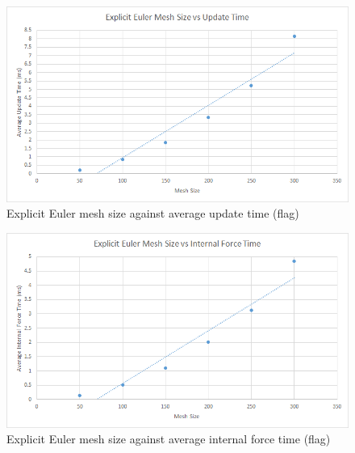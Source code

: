     \begin{figure}
    \begin{center}
      \includegraphics[scale=.9]{Figures/flag_ee_m_ut}
    \end{center}
    \caption{Explicit Euler mesh size against average update time (flag)}
    \label{fig:ee mesh update flag}
  \end{figure}
  
    \begin{figure}
    \begin{center}
      \includegraphics[scale=.9]{Figures/flag_ee_m_csf}
    \end{center}
    \caption{Explicit Euler mesh size against average internal force time (flag)}
    \label{fig:ee mesh csf flag}
  \end{figure}
  
